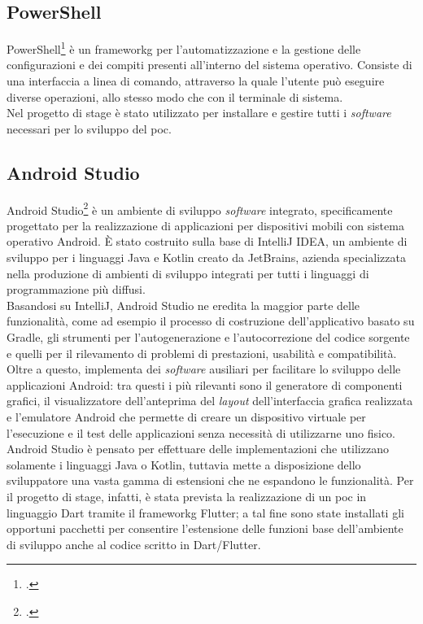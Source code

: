 \subsection{PowerShell}

PowerShell\footcite{site:powershell} è un \gls{frameworkg} per l'automatizzazione e la gestione delle configurazioni e dei compiti presenti all'interno del sistema operativo. Consiste di una interfaccia a linea di comando, attraverso la quale l'utente può eseguire diverse operazioni, allo stesso modo che con il terminale di sistema.\\
Nel progetto di stage è stato utilizzato per installare e gestire tutti i \textit{software} necessari per lo sviluppo del \gls{poc}.

\subsection{Android Studio}

Android Studio\footcite{site:android-studio} è un ambiente di sviluppo \textit{software} integrato, specificamente progettato per la realizzazione di applicazioni per dispositivi mobili con sistema operativo Android. È stato costruito sulla base di IntelliJ IDEA, un ambiente di sviluppo per i linguaggi Java e Kotlin creato da JetBrains, azienda specializzata nella produzione di ambienti di sviluppo integrati per tutti i linguaggi di programmazione più diffusi.\\
Basandosi su IntelliJ, Android Studio ne eredita la maggior parte delle funzionalità, come ad esempio il processo di costruzione dell'applicativo basato su Gradle, gli strumenti per l'autogenerazione e l'autocorrezione del codice sorgente e quelli per il rilevamento di problemi di prestazioni, usabilità e compatibilità. Oltre a questo, implementa dei \textit{software} ausiliari per facilitare lo sviluppo delle applicazioni Android: tra questi i più rilevanti sono il generatore di componenti grafici, il visualizzatore dell'anteprima del \textit{layout} dell'interfaccia grafica realizzata e l'emulatore Android che permette di creare un dispositivo virtuale per l'esecuzione e il test delle applicazioni senza necessità di utilizzarne uno fisico.\\
Android Studio è pensato per effettuare delle implementazioni che utilizzano solamente i linguaggi Java o Kotlin, tuttavia mette a disposizione dello sviluppatore una vasta gamma di estensioni che ne espandono le funzionalità. Per il progetto di stage, infatti, è stata prevista la realizzazione di un \gls{poc} in linguaggio Dart tramite il \gls{frameworkg} Flutter; a tal fine sono state installati gli opportuni pacchetti per consentire l'estensione delle funzioni base dell'ambiente di sviluppo anche al codice scritto in Dart/Flutter.

